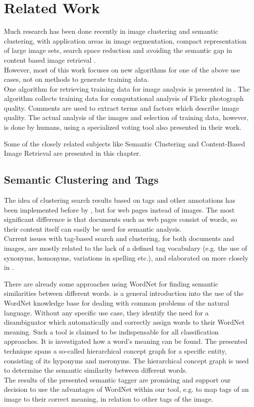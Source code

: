 \section{Related Work}
\label{sec_relatedwork}

Much research has been done recently in image clustering and semantic clustering, with application areas in image segmentation, compact representation of large image sets, search space reduction and avoiding the semantic gap in content based image retrieval \cite{Lim2011}. \\
However, most of this work focuses on new algorithms for one of the above use cases, not on methods to generate training data. \\

One algorithm for retrieving training data for image analysis is presented in \cite{Orendovici2010}. The algorithm collects training data for computational analysis of Flickr photograph quality. Comments are used to extract terms and factors which describe image quality. The actual analysis of the images and selection of training data, however, is done by humans, using a specialized voting tool also presented in their work.

\bigskip
Some of the closely related subjects like Semantic Clustering and Content-Based Image Retrieval are presented in this chapter.

\subsection{Semantic Clustering and Tags}
The idea of clustering search results based on tags and other annotations has been implemented before by \cite{Ramage2009}, but for web pages instead of images. The most significant difference is that documents such as web pages consist of words, so their content itself can easily be used for semantic analysis.\\
Current issues with tag-based search and clustering, for both documents and images, are mostly related to the lack of a defined tag vocabulary (e.g. the use of synonyms, homonyms, variations in spelling etc.), and elaborated on more closely in \cite{Auer2011}.

\bigskip
There are already some approaches using WordNet for finding semantic similarities between different words.  \cite{richardson1994using} is a general introduction into the use of the WordNet knowledge base for dealing with common problems of the natural language. Without any specific use case, they identify the need for a disambiguator which automatically and correctly assign words to their WordNet meaning. Such a tool is claimed to be indispensable for all classification approaches. It is investigated how a word's meaning can be found. The presented technique spans a so-called hierarchical concept graph for a specific entity, consisting of its hyponyms  and meronyms. The hierarchical concept graph is used to determine the semantic similarity between different words. \\
The results of the presented semantic tagger are promising and support our decision to use the advantages of WordNet within our tool, e.g. to map tags of an image to their correct meaning, in relation to other tags of the image.

